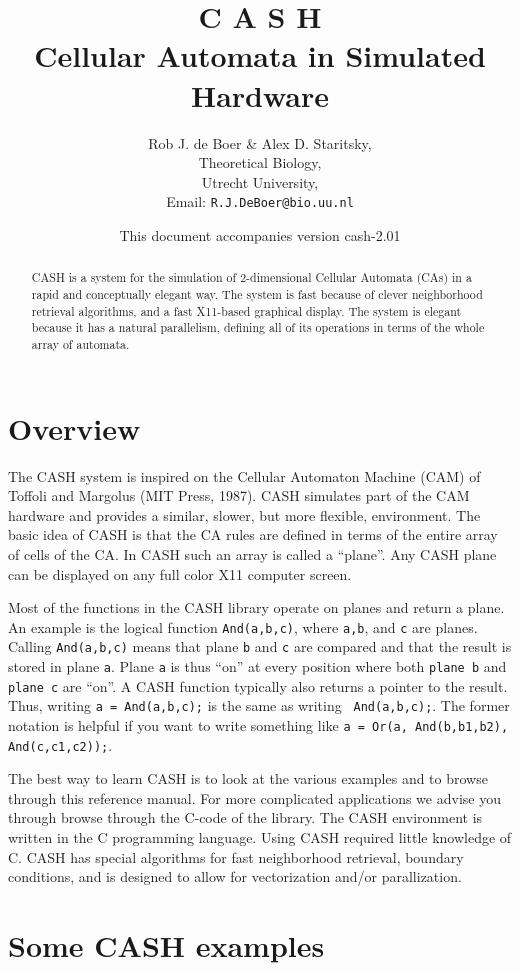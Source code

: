 \documentclass[12pt]{article}
\title{C A S H\\Cellular Automata in Simulated Hardware}
\author{Rob J. de Boer \& Alex D. Staritsky,
\\Theoretical Biology,\\Utrecht University,
\\Email: \texttt{R.J.DeBoer@bio.uu.nl}}
\date{This document accompanies version cash-2.01}
\begin{document}
\maketitle 

\begin{abstract} 
CASH is a system for the simulation of 2-dimensional Cellular Automata
(CAs) in a rapid and conceptually elegant way. The system is fast 
because of clever neighborhood retrieval algorithms, and a fast
X11-based graphical display.
The system is elegant because it has a natural parallelism,
defining all of its operations in terms of the whole array
of automata. 
\end{abstract}

\section{Overview}
The CASH system is inspired on the Cellular Automaton Machine (CAM)
of Toffoli and Margolus (MIT Press, 1987). 
CASH simulates part of the
CAM hardware and provides a similar, slower, but more flexible,
environment.   The basic idea of CASH is that the CA rules are
defined in  terms of the entire array of cells of the CA. In CASH
such an array is called a ``plane''. Any CASH plane can be displayed
on any full color X11 computer screen.

Most of the functions in the CASH library operate on planes and return a
plane. An example is the logical function {\tt And(a,b,c)}, where
{\tt a,b}, and {\tt c} are planes. Calling {\tt And(a,b,c)}
means that plane {\tt b} and {\tt c} are
compared and that the result is stored in  plane {\tt a}.
Plane {\tt a} is thus ``on'' at every position where both
{\tt plane  b} and {\tt plane c} are ``on''.
A CASH function typically also returns a pointer to the result. 
Thus, writing {\tt a = And(a,b,c);} is the same as writing {\tt
And(a,b,c);}. The former notation is helpful if you want to write
something like {\tt a = Or(a, And(b,b1,b2), And(c,c1,c2));}.

The best way to learn CASH is to look at the various examples and
to browse through this reference manual. For more complicated
applications we advise you through browse through the C-code of
the library.
The CASH environment is written in the C programming
language. Using CASH required little knowledge of C. 
CASH has special algorithms for fast neighborhood retrieval,
boundary conditions, and is designed to allow for vectorization
and/or parallization.

\section{Some CASH examples}
\end{document}
